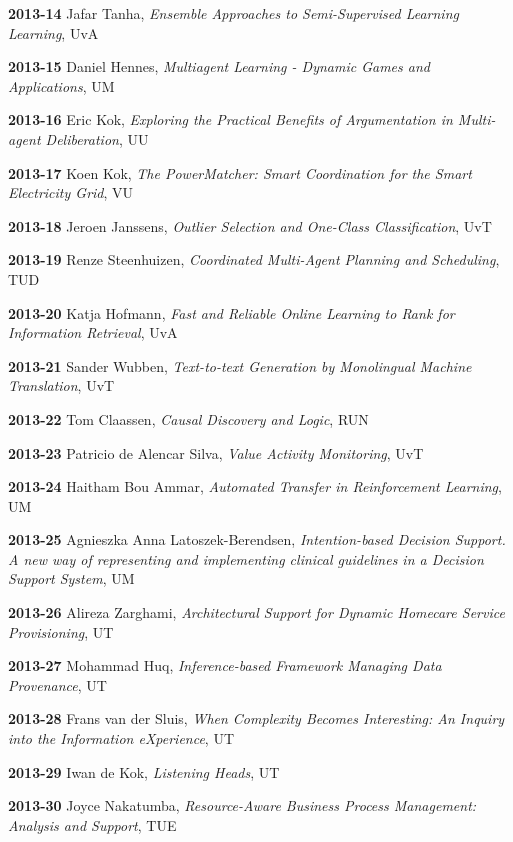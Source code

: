 \begin{multicols}{2}
\textbf{2013-14}   Jafar Tanha, \textit{Ensemble Approaches to Semi-Supervised Learning Learning}, UvA

\textbf{2013-15}   Daniel Hennes, \textit{Multiagent Learning - Dynamic Games and Applications}, UM

\textbf{2013-16}   Eric Kok, \textit{Exploring the Practical Benefits of Argumentation in Multi-agent Deliberation}, UU

\textbf{2013-17}   Koen Kok, \textit{The PowerMatcher: Smart Coordination for the Smart Electricity Grid}, VU

\textbf{2013-18}   Jeroen Janssens, \textit{Outlier Selection and One-Class Classification}, UvT

\textbf{2013-19}   Renze Steenhuizen, \textit{Coordinated Multi-Agent Planning and Scheduling}, TUD

\textbf{2013-20}   Katja Hofmann, \textit{Fast and Reliable Online Learning to Rank for Information Retrieval}, UvA

\textbf{2013-21}   Sander Wubben, \textit{Text-to-text Generation by Monolingual Machine Translation}, UvT

\textbf{2013-22}   Tom Claassen, \textit{Causal Discovery and Logic}, RUN

\textbf{2013-23}   Patricio de Alencar Silva, \textit{Value Activity Monitoring}, UvT

\textbf{2013-24}   Haitham Bou Ammar, \textit{Automated Transfer in Reinforcement Learning}, UM

\textbf{2013-25}   Agnieszka Anna Latoszek-Berendsen, \textit{Intention-based Decision Support. A new way of representing and implementing clinical guidelines in a Decision Support System}, UM

\textbf{2013-26}   Alireza Zarghami, \textit{Architectural Support for Dynamic Homecare Service Provisioning}, UT

\textbf{2013-27}   Mohammad Huq, \textit{Inference-based Framework Managing Data Provenance}, UT

\textbf{2013-28}   Frans van der Sluis, \textit{When Complexity Becomes Interesting: An Inquiry into the Information eXperience}, UT

\textbf{2013-29}   Iwan de Kok, \textit{Listening Heads}, UT

\textbf{2013-30}   Joyce Nakatumba, \textit{Resource-Aware Business Process Management: Analysis and Support}, TUE

\end{multicols}